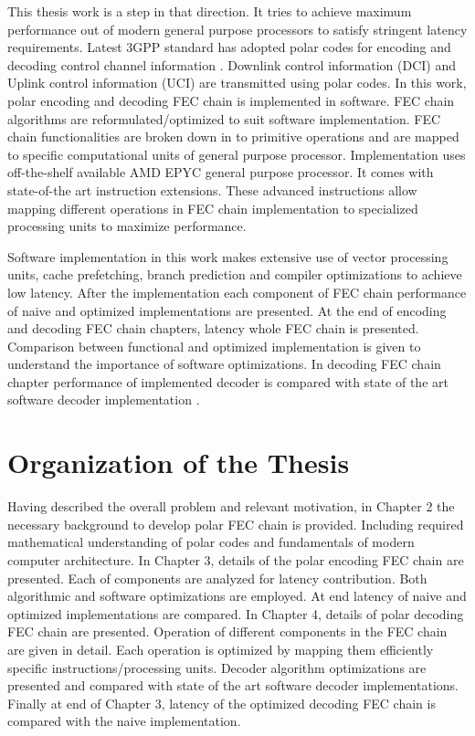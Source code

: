 This thesis work is a step in that direction. It tries to achieve maximum performance out of modern general purpose processors to satisfy stringent latency requirements. Latest 3GPP standard has adopted polar codes for encoding and decoding control channel information \cite{3gpp.38.212}. Downlink control information (DCI) and Uplink control information (UCI) are transmitted using polar codes. In this work, polar encoding and decoding FEC chain is implemented in software. FEC chain algorithms are reformulated/optimized to suit software implementation. FEC chain functionalities are broken down in to primitive operations and are mapped to specific computational units of general purpose processor. Implementation uses off-the-shelf available AMD EPYC general purpose processor\cite{amdEpyc}. It comes with state-of-the art instruction extensions. These advanced instructions allow mapping different operations in FEC chain implementation to specialized processing units to maximize performance.

Software implementation in this work makes extensive use of vector processing units, cache prefetching, branch prediction and compiler optimizations to achieve low latency. After the implementation each component of FEC chain performance of naive and optimized implementations are presented. At the end of encoding and decoding FEC chain chapters, latency whole FEC chain  is presented. Comparison between functional and optimized implementation is given to understand the importance of software optimizations. In decoding FEC chain chapter performance of implemented decoder is compared with state of the art software decoder implementation \cite{lowLatencySWPolarDec}.

\section*{Organization of the Thesis}
Having described the overall problem and relevant motivation, in Chapter 2 the necessary background to develop polar FEC chain is provided. Including required mathematical understanding of polar codes and fundamentals of modern computer architecture. In Chapter 3, details of the polar encoding FEC chain are presented. Each of components are analyzed for latency contribution. Both algorithmic and software optimizations are employed. At end latency of naive and optimized implementations are compared. In Chapter 4, details of polar decoding FEC chain are presented. Operation of different components in the FEC chain are given in detail. Each operation is optimized by mapping them efficiently specific instructions/processing units. Decoder algorithm optimizations are presented and compared with state of the art software decoder implementations. Finally at end of Chapter 3, latency of the optimized decoding FEC chain is compared with the naive implementation.